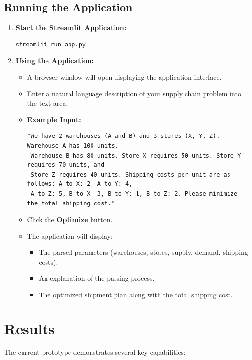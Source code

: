 \documentclass[11pt]{article}
\begin{document}
\subsection*{Running the Application}
\begin{enumerate}[label=\arabic*.]
    \item \textbf{Start the Streamlit Application:}
    \begin{verbatim}
streamlit run app.py
    \end{verbatim}
    \item \textbf{Using the Application:}
    \begin{itemize}
        \item A browser window will open displaying the application interface.
        \item Enter a natural language description of your supply chain problem into the text area.
        \item \textbf{Example Input:}
        \begin{verbatim}
"We have 2 warehouses (A and B) and 3 stores (X, Y, Z). Warehouse A has 100 units,
 Warehouse B has 80 units. Store X requires 50 units, Store Y requires 70 units, and 
 Store Z requires 40 units. Shipping costs per unit are as follows: A to X: 2, A to Y: 4,
 A to Z: 5, B to X: 3, B to Y: 1, B to Z: 2. Please minimize the total shipping cost."
        \end{verbatim}
        \item Click the \textbf{Optimize} button.
        \item The application will display:
        \begin{itemize}
            \item The parsed parameters (warehouses, stores, supply, demand, shipping costs).
            \item An explanation of the parsing process.
            \item The optimized shipment plan along with the total shipping cost.
        \end{itemize}
    \end{itemize}
\end{enumerate}

\section{Results}
The current prototype demonstrates several key capabilities:
\end{document}
